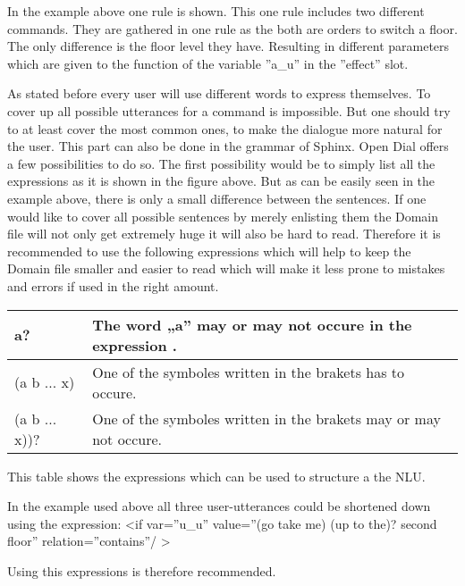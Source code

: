 In the example above one rule is shown.
This one rule includes two different commands.
They are gathered in one rule as the both are orders to switch a floor.
The only difference is the floor level they have.
Resulting in different parameters which are given to the function of the variable ”a\_u” in the ”effect” slot. \newline



As stated before every user will use different words to express themselves.
To cover up all possible utterances for a command is impossible.
But one should try to at least cover the most common ones,  to make the dialogue more natural for the user.
This part can also be done in the grammar of Sphinx.
Open Dial offers a few possibilities to do so.
The first possibility would be to simply list all the expressions as it is shown in the figure above.
But as can be easily seen in the example above, there is only a small difference between the sentences.
If one would like to cover all possible sentences by merely enlisting them the Domain file will not only get extremely huge it will also be hard to read.
Therefore it is recommended to use the following expressions which will help to keep the Domain file smaller and easier to read which will make it less prone to mistakes and errors if used in the right amount. \newline


\begin{tabular}{|ll|}
\hline
	a? & The word „a” may or may not occure in the expression .  \\
\hline
	(a \textbar b \textbar... \textbar x) & One of the symboles written	in the brakets has to occure.\\
\hline
	(a \textbar b \textbar... \textbar x))? & One of the symboles written in the brakets may or may not occure.  \\
\hline
\end{tabular}
\newline

This table shows the expressions which can be used to structure a the NLU. \newline \newline

In the example used above all three user-utterances could be shortened down using the expression:
\textless if var=”u\_u” value=”(go \textbar take me) (up to the)?  second floor” relation=”contains”/ \textgreater

Using this expressions is therefore recommended.


